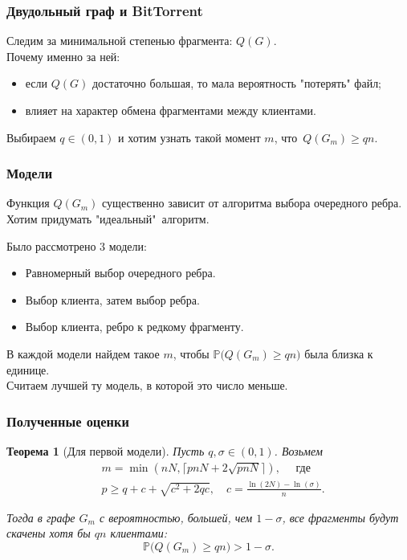 \documentclass[pdf, intlimits, 12pt, unicode]{beamer} %
\newcommand{\PRob}{\mathbb P}
\newcommand{\geqs}{\geqslant}
\newtheorem*{theoremm}{Теорема}
\begin{document}
\begin{frame}
	\frametitle{Двудольный граф и BitTorrent}
	Следим за минимальной степенью фрагмента: $Q(G)$.\\
	
	Почему именно за ней:
	\begin{itemize}
		\item если $Q(G)$ достаточно большая, то мала вероятность "потерять" файл;
		\item влияет на характер обмена фрагментами между клиентами.
	\end{itemize}
	Выбираем $q \in (0,1)$ и
	хотим узнать такой момент $m$, что~$Q(G_m) \geqs qn$.
\end{frame}


\begin{frame}
	\frametitle{Модели}
	Функция $Q(G_m)$ существенно зависит от алгоритма выбора очередного ребра. \\
	Хотим придумать "идеальный"\ алгоритм.
 
	\bigskip

	Было рассмотрено 3 модели:
	\begin{itemize}
		\item Равномерный выбор очередного ребра.
		\item Выбор клиента, затем выбор ребра.
		\item Выбор клиента, ребро к редкому фрагменту.
	\end{itemize}
	
	\medskip
	В каждой модели найдем такое $m$, чтобы $\PRob\big(Q(G_m) \geqs qn\big)$ была близка к единице.\\
	Считаем лучшей ту модель, в которой это число меньше.
	
\end{frame}



\begin{frame}
	\frametitle{Полученные оценки}

\begin{theoremm}[Для первой модели]
	Пусть $q, \sigma \in (0, 1)$. Возьмем 
		\vspace{-3.5mm}
		\begin{align*}
		& m = \min(nN, \lceil pnN + 2\sqrt{pnN} \rceil), \quad \text{ где} \\
		& p \geqs q + c + \sqrt{c^2+2qc}, \quad c = \frac{\ln(2N) - \ln(\sigma)}{n}.
		\end{align*}
		\vspace{-6.5mm}
		
	Тогда в графе $G_m$ с вероятностью, большей, чем $1 - \sigma$, все фрагменты будут скачены хотя бы $qn$ клиентами:
		\vspace{-3.5mm}
		\begin{equation*}
		\PRob\big(Q(G_m) \geqs qn\big) > 1 - \sigma.
		\end{equation*}
\end{theoremm}

\end{frame}
\end{document}
